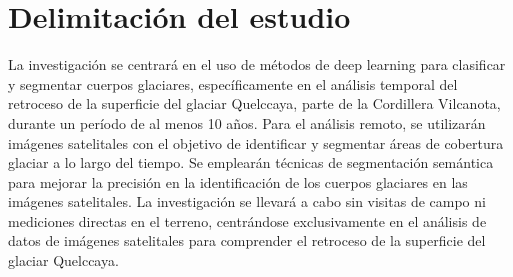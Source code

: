 		

\section{Delimitación del estudio}


La investigación se centrará en el uso de métodos de deep learning para clasificar y segmentar cuerpos glaciares, específicamente en el análisis temporal del retroceso de la superficie del glaciar Quelccaya, parte de la Cordillera Vilcanota, durante un período de al menos 10 años. Para el análisis remoto, se utilizarán imágenes satelitales con el objetivo de identificar y segmentar áreas de cobertura glaciar a lo largo del tiempo. Se emplearán técnicas de segmentación semántica para mejorar la precisión en la identificación de los cuerpos glaciares en las imágenes satelitales. La investigación se llevará a cabo sin visitas de campo ni mediciones directas en el terreno, centrándose exclusivamente en el análisis de datos de imágenes satelitales para comprender el retroceso de la superficie del glaciar Quelccaya.



\singlespacing